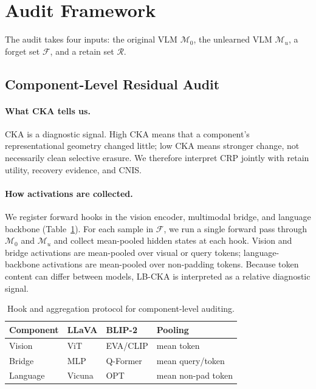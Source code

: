 \documentclass[letterpaper]{article}
\begin{document}
\section{Audit Framework}

The audit takes four inputs: the original VLM $\mathcal{M}_0$, the unlearned
VLM $\mathcal{M}_u$, a forget set $\mathcal{F}$, and a retain set
$\mathcal{R}$.

\subsection{Component-Level Residual Audit}

\paragraph{What CKA tells us.}
CKA is a diagnostic signal. High CKA means that a component's
representational geometry changed little; low CKA means stronger change, not
necessarily clean selective erasure. We therefore interpret CRP jointly with
retain utility, recovery evidence, and CNIS.

\paragraph{How activations are collected.}
We register forward hooks in the vision encoder, multimodal bridge, and
language backbone (Table~\ref{tab:hooks}). For each sample in $\mathcal{F}$,
we run a single forward pass through $\mathcal{M}_0$ and $\mathcal{M}_u$ and
collect mean-pooled hidden states at each hook. Vision and bridge activations
are mean-pooled over visual or query tokens; language-backbone activations are
mean-pooled over non-padding tokens. Because token content can differ between
models, LB-CKA is interpreted as a relative diagnostic signal.

\begin{table}[t]
\centering
\caption{Hook and aggregation protocol for component-level auditing.}
\label{tab:hooks}
\setlength{\tabcolsep}{4pt}
\scriptsize
\begin{tabular}{llll}
\toprule
\textbf{Component} & \textbf{LLaVA} & \textbf{BLIP-2} & \textbf{Pooling} \\
\midrule
Vision   & ViT      & EVA/CLIP & mean token \\
Bridge   & MLP      & Q-Former & mean query/token \\
Language & Vicuna   & OPT      & mean non-pad token \\
\bottomrule
\end{tabular}
\end{table}
\end{document}

